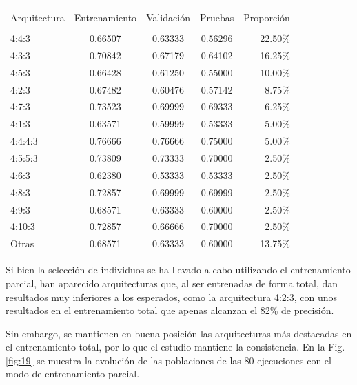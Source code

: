 \documentclass[spanish,a4paper,12pt,twoside]{report}
\begin{document}
  \begin{center}
     \label{table}
    \begin{tabular}{l c c c r}
      \hline \\ [-2ex]
      Arquitectura & Entrenamiento & Validación & Pruebas & Proporción \\ [0.5ex]
      \hline \\ [-1ex]
      4:4:3 & 0.66507 & 0.63333 & 0.56296 & 22.50\% \\
      4:3:3 & 0.70842 & 0.67179 & 0.64102 & 16.25\% \\ 
      4:5:3 & 0.66428 & 0.61250 & 0.55000 & 10.00\% \\
      4:2:3 & 0.67482 & 0.60476 & 0.57142 & 8.75\% \\
      4:7:3 & 0.73523 & 0.69999 & 0.69333 & 6.25\% \\ 
      4:1:3 & 0.63571 & 0.59999 & 0.53333 & 5.00\% \\
      4:4:4:3 & 0.76666 & 0.76666 & 0.75000 & 5.00\% \\
      4:5:5:3 & 0.73809 & 0.73333 & 0.70000 & 2.50\% \\
      4:6:3 & 0.62380 & 0.53333 & 0.53333 & 2.50\% \\
      4:8:3 & 0.72857 & 0.69999 & 0.69999 & 2.50\% \\ 
      4:9:3 & 0.68571 & 0.63333 & 0.60000 & 2.50\% \\
      4:10:3 & 0.72857 & 0.66666 & 0.70000 & 2.50\% \\ 
      Otras & 0.68571 & 0.63333 & 0.60000 & 13.75\% \\ [1ex]
      \hline
    \end{tabular}
  \end{center} \par
  Si bien la selección de individuos se ha llevado a cabo utilizando el entrenamiento parcial, han aparecido arquitecturas que, al ser entrenadas de forma total, dan resultados muy inferiores a los esperados, como la arquitectura 4:2:3, con unos resultados en el entrenamiento total que apenas alcanzan el 82\% de precisión. \par
  Sin embargo, se mantienen en buena posición las arquitecturas más destacadas en el entrenamiento total, por lo que el estudio mantiene la consistencia. En la Fig. \ref{fig:19} se muestra la evolución de las poblaciones de las 80 ejecuciones con el modo de entrenamiento parcial.
\end{document}
